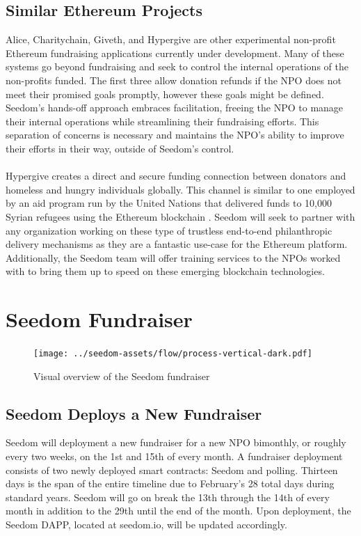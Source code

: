 \documentclass[11pt]{article}
\begin{document}
\subsection{Similar Ethereum Projects}

Alice, Charitychain, Giveth, and Hypergive are other experimental non-profit Ethereum fundraising applications currently under development. Many of these systems go beyond fundraising and seek to control the internal operations of the non-profits funded. The first three allow donation refunds if the NPO does not meet their promised goals promptly, however these goals might be defined. Seedom's hands-off approach embraces facilitation, freeing the NPO to manage their internal operations while streamlining their fundraising efforts. This separation of concerns is necessary and maintains the NPO's ability to improve their efforts in their way, outside of Seedom's control.\\\\
Hypergive creates a direct and secure funding connection between donators and homeless and hungry individuals globally. This channel is similar to one employed by an aid program run by the United Nations that delivered funds to 10,000 Syrian refugees using the Ethereum blockchain \cite{6}. Seedom will seek to partner with any organization working on these type of trustless end-to-end philanthropic delivery mechanisms as they are a fantastic use-case for the Ethereum platform. Additionally, the Seedom team will offer training services to the NPOs worked with to bring them up to speed on these emerging blockchain technologies.

\section{Seedom Fundraiser}

\begin{figure}[H]
\begin{center}
\texttt{[image: ../seedom-assets/flow/process-vertical-dark.pdf]}
\caption{Visual overview of the Seedom fundraiser}
\end{center}
\end{figure}

\subsection{Seedom Deploys a New Fundraiser}

Seedom will deployment a new fundraiser for a new NPO bimonthly, or roughly every two weeks, on the 1st and 15th of every month. A fundraiser deployment consists of two newly deployed smart contracts: Seedom and polling. Thirteen days is the span of the entire timeline due to February's 28 total days during standard years. Seedom will go on break the 13th through the 14th of every month in addition to the 29th until the end of the month. Upon deployment, the Seedom DAPP, located at seedom.io, will be updated accordingly.
\end{document}

